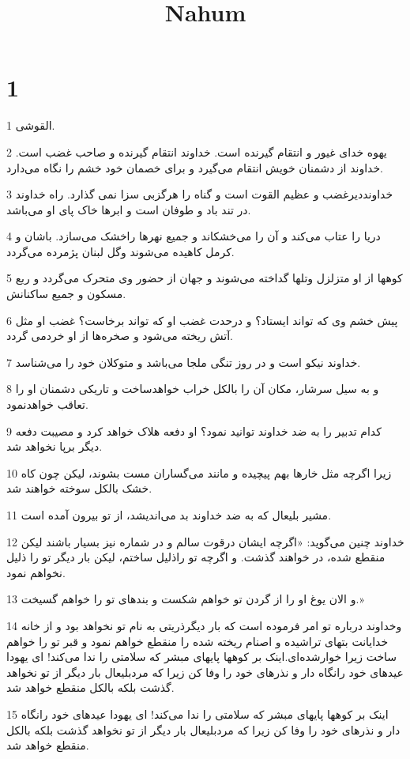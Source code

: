 

\title{Nahum}


\chapter{1}

\par 1 القوشی.
\par 2 یهوه خدای غیور و انتقام گیرنده است. خداوند انتقام گیرنده و صاحب غضب است. خداوند از دشمنان خویش انتقام می‌گیرد و برای خصمان خود خشم را نگاه می‌دارد.
\par 3 خداونددیرغضب و عظیم القوت است و گناه را هرگزبی سزا نمی گذارد. راه خداوند در تند باد و طوفان است و ابرها خاک پای او می‌باشد.
\par 4 دریا را عتاب می‌کند و آن را می‌خشکاند و جمیع نهرها راخشک می‌سازد. باشان و کرمل کاهیده می‌شوند وگل لبنان پژمرده می‌گردد.
\par 5 کوهها از او متزلزل وتلها گداخته می‌شوند و جهان از حضور وی متحرک می‌گردد و ربع مسکون و جمیع ساکنانش.
\par 6 پیش خشم وی که تواند ایستاد؟ و درحدت غضب او که تواند برخاست؟ غضب او مثل آتش ریخته می‌شود و صخره‌ها از او خردمی گردد.
\par 7 خداوند نیکو است و در روز تنگی ملجا می‌باشد و متوکلان خود را می‌شناسد.
\par 8 و به سیل سرشار، مکان آن را بالکل خراب خواهدساخت و تاریکی دشمنان او را تعاقب خواهدنمود.
\par 9 کدام تدبیر را به ضد خداوند توانید نمود؟ او دفعه هلاک خواهد کرد و مصیبت دفعه دیگر برپا نخواهد شد.
\par 10 زیرا اگرچه مثل خارها بهم پیچیده و مانند می‌گساران مست بشوند، لیکن چون کاه خشک بالکل سوخته خواهند شد.
\par 11 مشیر بلیعال که به ضد خداوند بد می‌اندیشد، از تو بیرون آمده است.
\par 12 خداوند چنین می‌گوید: «اگرچه ایشان درقوت سالم و در شماره نیز بسیار باشند لیکن منقطع شده، در خواهند گذشت. و اگر‌چه تو راذلیل ساختم، لیکن بار دیگر تو را ذلیل نخواهم نمود.
\par 13 و الان یوغ او را از گردن تو خواهم شکست و بندهای تو را خواهم گسیخت.»
\par 14 وخداوند درباره تو امر فرموده است که بار دیگرذریتی به نام تو نخواهد بود و از خانه خدایانت بتهای تراشیده و اصنام ریخته شده را منقطع خواهم نمود و قبر تو را خواهم ساخت زیرا خوارشده‌ای.اینک بر کوهها پایهای مبشر که سلامتی را ندا می‌کند! ای یهودا عیدهای خود رانگاه دار و نذرهای خود را وفا کن زیرا که مردبلیعال بار دیگر از تو نخواهد گذشت بلکه بالکل منقطع خواهد شد.
\par 15 اینک بر کوهها پایهای مبشر که سلامتی را ندا می‌کند! ای یهودا عیدهای خود رانگاه دار و نذرهای خود را وفا کن زیرا که مردبلیعال بار دیگر از تو نخواهد گذشت بلکه بالکل منقطع خواهد شد.

